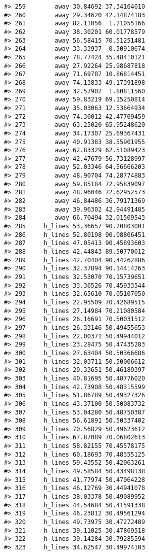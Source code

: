 \documentclass[
]{book}
\theoremstyle{definition}
\theoremstyle{definition}
\theoremstyle{definition}
\theoremstyle{definition}
\theoremstyle{remark}
\begin{document}
\begin{verbatim}
#> 259        away 30.84692 37.34164010
#> 260        away 29.34620 42.14874183
#> 261        away 82.11056  1.21055166
#> 262        away 38.30201 60.01778579
#> 263        away 56.58415 70.51251481
#> 264        away 33.33937  0.50910674
#> 265        away 78.77424 35.48410121
#> 266        away 27.92264 25.98687818
#> 267        away 71.69787 10.86814451
#> 268        away 74.13833 49.17391898
#> 269        away 32.57902  1.80811560
#> 270        away 59.83219 69.15250814
#> 271        away 35.03063 12.53664934
#> 272        away 74.30012 42.47709459
#> 273        away 63.25020 65.95248620
#> 274        away 34.17307 25.69367431
#> 275        away 40.91383 38.55901955
#> 276        away 62.83329 62.51089423
#> 277        away 42.47679 56.73128997
#> 278        away 52.03346 64.56666203
#> 279        away 48.90704 74.28774883
#> 280        away 59.85184 72.95839097
#> 281        away 48.96046 72.62952573
#> 282        away 46.84486 36.79171369
#> 283        away 39.96302 42.94491485
#> 284        away 66.70494 32.01509543
#> 285     h_lines 53.36657 90.20803001
#> 286     h_lines 52.80198 90.08806451
#> 287     h_lines 47.05413 90.45893603
#> 288     h_lines 42.44843 89.50770012
#> 289     h_lines 42.70404 90.44262886
#> 290     h_lines 32.37894 90.14414263
#> 291     h_lines 32.53070 70.15739651
#> 292     h_lines 33.36526 70.45933544
#> 293     h_lines 32.65610 70.05107050
#> 294     h_lines 22.95509 70.42689515
#> 295     h_lines 27.14984 70.21080584
#> 296     h_lines 26.16691 70.50031512
#> 297     h_lines 26.33146 50.49455653
#> 298     h_lines 22.00371 50.49944012
#> 299     h_lines 23.28475 50.47435283
#> 300     h_lines 27.63404 50.50366686
#> 301     h_lines 32.03711 50.50006612
#> 302     h_lines 29.33651 50.46189397
#> 303     h_lines 40.81695 50.48776020
#> 304     h_lines 42.73908 50.48315599
#> 305     h_lines 51.86789 50.49327326
#> 306     h_lines 43.37100 50.50083732
#> 307     h_lines 53.04280 50.48750387
#> 308     h_lines 56.61891 50.50337402
#> 309     h_lines 70.56829 50.49623612
#> 310     h_lines 67.87089 70.06802613
#> 311     h_lines 58.82155 70.45578175
#> 312     h_lines 60.18693 70.48355125
#> 313     h_lines 59.43552 50.42063261
#> 314     h_lines 49.58584 50.43498138
#> 315     h_lines 41.77974 50.47064228
#> 316     h_lines 46.12769 30.44941078
#> 317     h_lines 38.03378 50.49089952
#> 318     h_lines 44.54684 50.41591338
#> 319     h_lines 46.23812 30.49561294
#> 320     h_lines 49.73975 30.47272489
#> 321     h_lines 39.11025 30.47869518
#> 322     h_lines 39.14284 30.79285594
#> 323     h_lines 34.62547 30.49974103

\end{verbatim}
\end{document}
